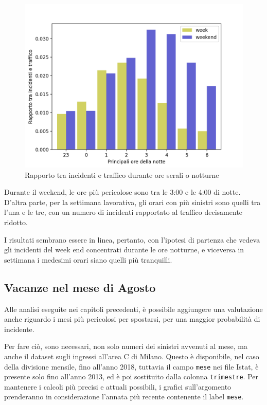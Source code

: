 \documentclass[a4paper,12pt]{report}
\newcommand{\columnstyle}[1]{\texttt{#1}}
\begin{document}
\begin{figure}
    \includegraphics[width=\linewidth]{../src/area_c/rapporto_inc_notte.png}
    \caption{Rapporto tra incidenti e traffico durante ore serali o notturne}
    \label{fig:rapp-inc-traff}
\end{figure}

Durante il weekend, le ore più pericolose sono tra le 3:00 e le 4:00 di notte. 
D'altra parte, per la settimana lavorativa, gli orari con più sinistri sono quelli 
tra l'una e le tre, con un numero di incidenti rapportato al 
traffico decisamente ridotto. 

I risultati sembrano essere 
in linea, pertanto, con l'ipotesi di partenza che vedeva gli incidenti del week 
end concentrati durante le ore notturne, e viceversa in settimana i medesimi orari 
siano quelli più tranquilli.

\subsection{Vacanze nel mese di Agosto}

Alle analisi eseguite nei capitoli precedenti, 
è possibile aggiungere una valutazione anche riguardo i mesi più pericolosi per spostarsi, 
per una maggior probabilità di incidente.

Per fare ciò, sono necessari, non solo numeri dei sinistri avvenuti al mese, 
ma anche il dataset sugli ingressi all'area C di Milano. 
Questo è disponibile, nel caso della divisione 
mensile, fino all'anno 2018, tuttavia il campo \columnstyle{mese} nei file Istat, è 
presente solo fino all'anno 2013, ed è poi sostituito 
dalla colonna \columnstyle{trimestre}. 
Per mantenere i calcoli più precisi e attuali possibili, i grafici sull'argomento prenderanno 
in considerazione l'annata più recente contenente il label \columnstyle{mese}. 
\end{document}
